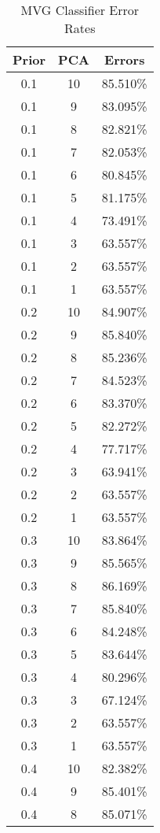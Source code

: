 \begin{center}
\begin{longtable}{|c | c | c|}
\caption{MVG Classifier Error Rates}\label{tab:mvgacctable}\\
\hline
Prior & PCA & Errors \\
\hline
0.1 & 10 & 85.510\% \\
\hline
0.1 & 9 & 83.095\% \\
\hline
0.1 & 8 & 82.821\% \\
\hline
0.1 & 7 & 82.053\% \\
\hline
0.1 & 6 & 80.845\% \\
\hline
0.1 & 5 & 81.175\% \\
\hline
0.1 & 4 & 73.491\% \\
\hline
0.1 & 3 & 63.557\% \\
\hline
0.1 & 2 & 63.557\% \\
\hline
0.1 & 1 & 63.557\% \\
\hline
\hline
0.2 & 10 & 84.907\% \\
\hline
0.2 & 9 & 85.840\% \\
\hline
0.2 & 8 & 85.236\% \\
\hline
0.2 & 7 & 84.523\% \\
\hline
0.2 & 6 & 83.370\% \\
\hline
0.2 & 5 & 82.272\% \\
\hline
0.2 & 4 & 77.717\% \\
\hline
0.2 & 3 & 63.941\% \\
\hline
0.2 & 2 & 63.557\% \\
\hline
0.2 & 1 & 63.557\% \\
\hline
\hline
0.3 & 10 & 83.864\% \\
\hline
0.3 & 9 & 85.565\% \\
\hline
0.3 & 8 & 86.169\% \\
\hline
0.3 & 7 & 85.840\% \\
\hline
0.3 & 6 & 84.248\% \\
\hline
0.3 & 5 & 83.644\% \\
\hline
0.3 & 4 & 80.296\% \\
\hline
0.3 & 3 & 67.124\% \\
\hline
0.3 & 2 & 63.557\% \\
\hline
0.3 & 1 & 63.557\% \\
\hline
\hline
0.4 & 10 & 82.382\% \\
\hline
0.4 & 9 & 85.401\% \\
\hline
0.4 & 8 & 85.071\% \\

\end{longtable}
\end{center}
